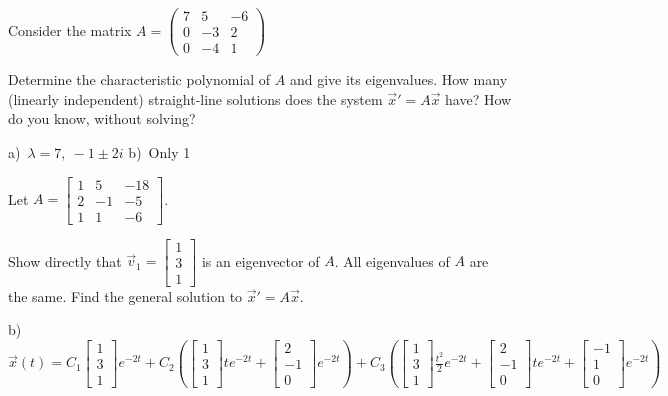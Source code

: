 \begin{exercise}
Consider the matrix
$A=\displaystyle \begin{pmatrix} 
7 & 5 & -6 \\
0 & -3 & 2 \\
0  & -4 & 1 \end{pmatrix}$
\begin{tasks}
\task Determine the characteristic polynomial of $A$ and give its eigenvalues.
\task How many (linearly independent) straight-line solutions does the system ${\vec{x}}'=A\vec{x}$ have? How do you know, without solving? 
\end{tasks}
\end{exercise}
\comboSol{%
}
{%
a)~$\lambda = 7,\ -1\pm 2i$ \quad b)~Only 1
}

\begin{exercise}
Let $A=\begin{bmatrix} 1&5&-18\\ 2&-1&-5 \\ 1&1&-6 \end{bmatrix}$. 
\begin{tasks}
\task Show directly that $\vec{v}_1=\begin{bmatrix} 1\\3\\1 \end{bmatrix}$ is an eigenvector of $A$.
\task All eigenvalues of $A$ are the same. Find the general solution to ${\vec{x}}'=A\vec{x}$.
\end{tasks}
\end{exercise}
\comboSol{%
}
{%
b)~$\vec{x}(t) = C_1\left[\begin{smallmatrix} 1 \\ 3 \\1 \end{smallmatrix}\right]e^{-2t} + C_2\left(\left[\begin{smallmatrix} 1 \\ 3 \\ 1 \end{smallmatrix}\right] te^{-2t} + \left[\begin{smallmatrix} 2 \\ -1 \\ 0 \end{smallmatrix}\right]e^{-2t}\right) + C_3\left( \left[\begin{smallmatrix} 1 \\ 3 \\1 \end{smallmatrix}\right] \frac{t^2}{2}e^{-2t} + \left[\begin{smallmatrix} 2 \\ -1 \\ 0 \end{smallmatrix}\right]te^{-2t} + \left[\begin{smallmatrix} -1 \\ 1 \\ 0 \end{smallmatrix}\right] e^{-2t}\right)$
}

